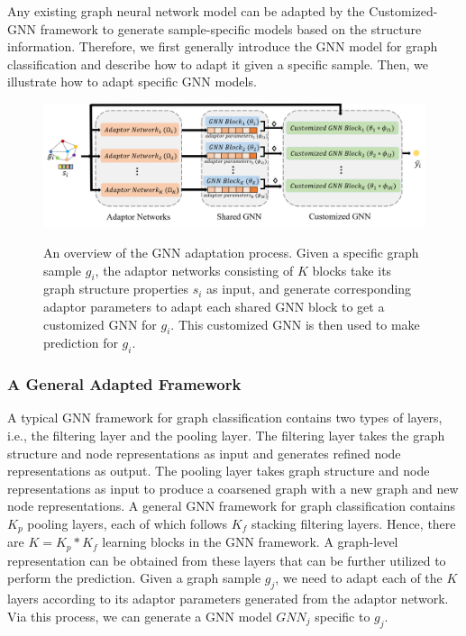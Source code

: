 \documentclass[11pt,dvipdfm]{article}
\begin{document}
Any existing graph neural network model can be adapted by the Customized-GNN framework to generate sample-specific models based on the structure information. Therefore, we first generally introduce the GNN model for graph classification and describe how to adapt it given a specific sample. Then, we illustrate how to adapt specific GNN models. 
\begin{figure}[!t]
\begin{center}
{\includegraphics[width=1\linewidth]{submissions/Yiqi2023/figs/adaptation-frame.png}}%

\end{center}

\caption{An overview of the GNN adaptation process. Given a specific graph sample $g_i$, the adaptor networks consisting of $K$ blocks take its graph structure properties $s_i$ as input, and generate corresponding adaptor parameters to adapt each shared GNN block to get a customized GNN for $g_i$. This customized GNN is then used to make prediction for $g_i$.}

\label{fig:yiqi_adaptor-frame}

\end{figure}
\subsubsection{A General Adapted Framework}

A typical GNN framework for graph classification contains two types of layers, i.e., the filtering layer and the pooling layer. The filtering layer takes the graph structure and node representations as input and generates refined node representations as output. The pooling layer takes graph structure and node representations as input to produce a coarsened graph with a new graph and new node representations. A general GNN framework for graph classification contains $K_p$ pooling layers, each of which follows $K_f$ stacking filtering layers. Hence, there are $K=K_p*K_f$ learning blocks in the GNN framework. A graph-level representation can be obtained from these layers that can be further utilized to perform the prediction. Given a graph sample $g_j$, we need to adapt each of the $K$ layers according to its adaptor parameters generated from the adaptor network. Via this process, we can generate a GNN model $GNN_j$ specific to $g_j$.
\end{document}
